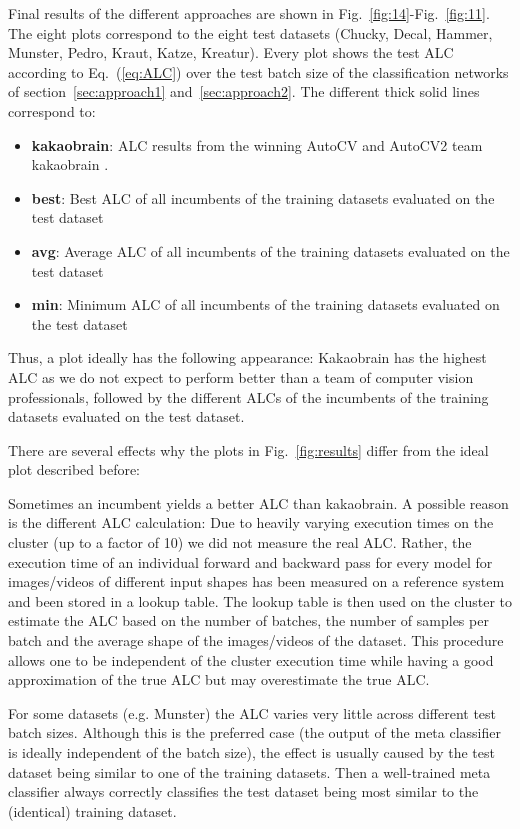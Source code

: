 \documentclass{article}
\begin{document}
Final results of the different approaches are shown in Fig.~\ref{fig:14}-Fig.~\ref{fig:11}. The eight plots correspond to the eight test datasets (Chucky, Decal, Hammer, Munster, Pedro, Kraut, Katze, Kreatur). Every plot shows the test ALC according to Eq.~(\ref{eq:ALC}) over the test batch size of the classification networks of section~\ref{sec:approach1} and~\ref{sec:approach2}. The different thick solid lines correspond to:
\begin{itemize}
\item \textbf{kakaobrain}: ALC results from the winning AutoCV and AutoCV2 team kakaobrain \cite{kakaobrain}.
\item \textbf{best}: Best ALC of all incumbents of the training datasets evaluated on the test dataset
\item \textbf{avg}: Average ALC of all incumbents of the training datasets evaluated on the test dataset
\item \textbf{min}: Minimum ALC of all incumbents of the training datasets evaluated on the test dataset
\end{itemize}
Thus, a plot ideally has the following appearance: Kakaobrain has the highest ALC as we do not expect to perform better than a team of computer vision professionals, followed by the different ALCs of the incumbents of the training datasets evaluated on the test dataset.

There are several effects why the plots in Fig.~\ref{fig:results} differ from the ideal plot described before: 

Sometimes an incumbent yields a better ALC than kakaobrain. A possible reason is the different ALC calculation: Due to heavily varying execution times on the cluster (up to a factor of 10) we did not measure the real ALC. Rather, the execution time of an individual forward and backward pass for every model for images/videos of different input shapes has been measured on a reference system and been stored in a lookup table. The lookup table is then used on the cluster to estimate the ALC based on the number of batches, the number of samples per batch and the average shape of the images/videos of the dataset. This procedure allows one to be independent of the cluster execution time while having a good approximation of the true ALC but may overestimate the true ALC.

For some datasets (e.g. Munster) the ALC varies very little across different test batch sizes. Although this is the preferred case (the output of the meta classifier is ideally independent of the batch size), the effect is usually caused by the test dataset being similar to one of the training datasets. Then a well-trained meta classifier always correctly classifies the test dataset being most similar to the (identical) training dataset.
\end{document}
